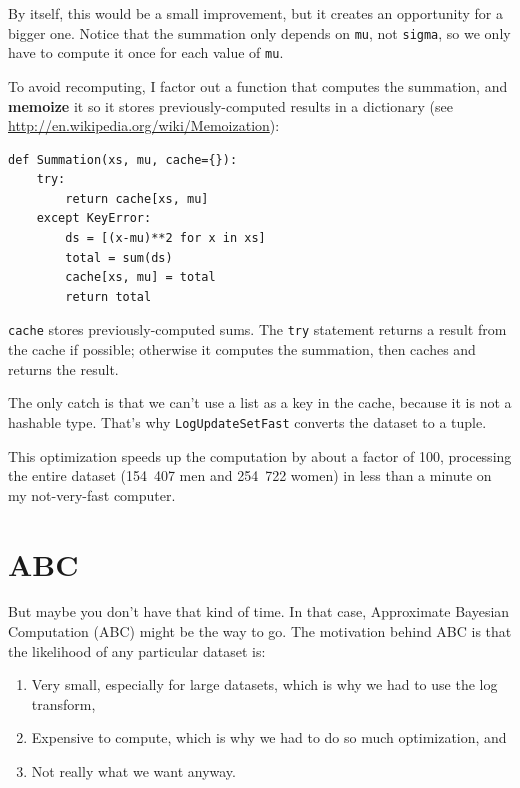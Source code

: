 \documentclass[12pt]{book}
\begin{document}
By itself, this would be a small improvement, but it
creates an opportunity for a bigger one.  Notice that the
summation only depends on {\tt mu}, not {\tt sigma}, so we only
have to compute it once for each value of {\tt mu}.

To avoid recomputing, I factor out a function that computes the
summation, and {\bf memoize} it so it stores previously-computed
results in a dictionary (see
\url{http://en.wikipedia.org/wiki/Memoization}): 

\begin{verbatim}
def Summation(xs, mu, cache={}):
    try:
        return cache[xs, mu]
    except KeyError:
        ds = [(x-mu)**2 for x in xs]
        total = sum(ds)
        cache[xs, mu] = total
        return total
\end{verbatim}

{\tt cache} stores previously-computed sums.  The {\tt try} statement
returns a result from the cache if possible; otherwise it computes
the summation, then caches and returns the result.

The only catch is that we can't use a list as a key in the cache, because
it is not a hashable type.  That's why {\tt LogUpdateSetFast} converts
the dataset to a tuple.

This optimization speeds up the computation by about a
factor of 100, processing the entire dataset (154~407 men and 254~722
women) in less than a minute on my not-very-fast computer.


\section{ABC}

But maybe you don't have that kind of time.  In that case, Approximate
Bayesian Computation (ABC) might be the way to go.  The motivation
behind ABC is that the likelihood of any particular dataset is:

\begin{enumerate}

\item Very small, especially for large datasets, which is why we had
to use the log transform,

\item Expensive to compute, which is why we had to do so much
optimization, and

\item Not really what we want anyway.

\end{enumerate}
\end{document}
